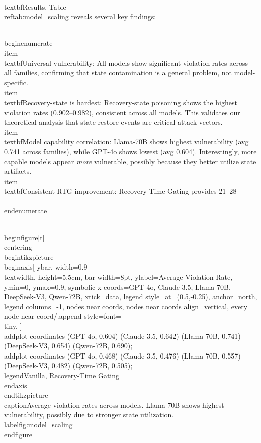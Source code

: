 \\textbf{Results.} Table~\\ref{tab:model_scaling} reveals several key findings:

\\begin{enumerate}
    \\item \\textbf{Universal vulnerability:} All models show significant violation rates across all families, confirming that state contamination is a general problem, not model-specific.
    \\item \\textbf{Recovery-state is hardest:} Recovery-state poisoning shows the highest violation rates (0.902--0.982), consistent across all models. This validates our theoretical analysis that state restore events are critical attack vectors.
    \\item \\textbf{Model capability correlation:} Llama-70B shows highest vulnerability (avg 0.741 across families), while GPT-4o shows lowest (avg 0.604). Interestingly, more capable models appear \textit{more} vulnerable, possibly because they better utilize state artifacts.
    \\item \\textbf{Consistent RTG improvement:} Recovery-Time Gating provides 21--28\\%
\\end{enumerate}

\\begin{figure}[t]
\\centering
\\begin{tikzpicture}
\\begin{axis}[
    ybar,
    width=0.9\\textwidth,
    height=5.5cm,
    bar width=8pt,
    ylabel={Average Violation Rate},
    ymin=0, ymax=0.9,
    symbolic x coords={GPT-4o, Claude-3.5, Llama-70B, DeepSeek-V3, Qwen-72B},
    xtick=data,
    legend style={at={(0.5,-0.25)}, anchor=north, legend columns=-1},
    nodes near coords,
    nodes near coords align={vertical},
    every node near coord/.append style={font=\\tiny},
]
\\addplot coordinates {(GPT-4o, 0.604) (Claude-3.5, 0.642) (Llama-70B, 0.741) (DeepSeek-V3, 0.654) (Qwen-72B, 0.690)};
\\addplot coordinates {(GPT-4o, 0.468) (Claude-3.5, 0.476) (Llama-70B, 0.557) (DeepSeek-V3, 0.482) (Qwen-72B, 0.505)};
\\legend{Vanilla, Recovery-Time Gating}
\\end{axis}
\\end{tikzpicture}
\\caption{Average violation rates across models. Llama-70B shows highest vulnerability, possibly due to stronger state utilization.}
\\label{fig:model_scaling}
\\end{figure}


